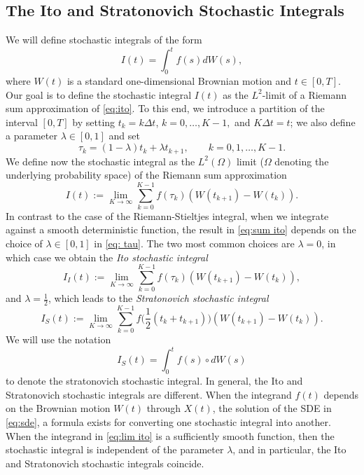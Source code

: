 \documentclass{article}
\begin{document}
\subsection*{The Ito and Stratonovich Stochastic Integrals}
We will define stochastic integrals of the form
\begin{equation}
    I(t)=\int_0^t f(s)dW(s), \label{eq:ito}
\end{equation}
where $W(t)$ is a standard one-dimensional Brownian motion and $t\in [0,T]$. 
Our goal is to define the stochastic integral $I(t)$ as the $L^2$-limit of  a Riemann sum approximation of \eqref{eq:ito}. To this end, we introduce a partition of the interval $[0,T]$ by setting $t_k=k\Delta t$, $ k=0,\dots,K-1,$ and $K\Delta t=t$;
we also define a parameter $\lambda \in [0,1]$ and set
\begin{equation}
    \tau_k = (1-\lambda)t_k+\lambda t_{k+1},\qquad k=0,1,\dots,K-1.
    \label{eq: tau}
\end{equation}
We define now the stochastic integral as the $L^2(\Omega)$ limit ($\Omega$ denoting the underlying probability space) of the Riemann sum approximation
\begin{equation}
    I(t):=\lim_{K \to \infty} \sum_{k=0}^{K-1} f(\tau_k)(W(t_{k+1})-W(t_k)).
    \label{eq:sum ito}
\end{equation}
In contrast to the case of the Riemann-Stieltjes integral, when we integrate against a smooth deterministic function, the result in \eqref{eq:sum ito} depends on the choice of $\lambda \in [0,1]$ in \eqref{eq: tau}. The two most common choices are $\lambda=0$, in which case we obtain the \textit{Ito stochastic integral}
\begin{equation}
    I_I(t) := \lim_{K\to \infty}\sum_{k=0}^{K-1} f(\tau_k)(W(t_{k+1})-W(t_k)),
    \label{eq:lim ito}
\end{equation}
and $\lambda=\frac{1}{2}$, which leads to the \textit{Stratonovich stochastic integral }
\begin{equation}
    I_S(t):=\lim_{K \to \infty} \sum_{k=0}^{K-1} f\big(\frac{1}{2}(t_k+t_{k+1})\big)(W(t_{k+1})-W(t_k)).
\end{equation}
We will use the notation 
$$I_S(t) = \int_0^t f(s) \circ d W(s)$$
to denote the stratonovich stochastic integral. In general, the Ito and Stratonovich stochastic integrals are different. When the integrand $f(t)$ depends on the Brownian motion $W(t)$ through $X(t)$, the solution of the SDE in \eqref{eq:sde}, a formula exists for converting one stochastic integral into another.
When the integrand in \eqref{eq:lim ito} is a sufficiently smooth function, then the stochastic integral is independent of the parameter $\lambda$, and in particular, the Ito and Stratonovich stochastic integrals coincide.
\end{document}

